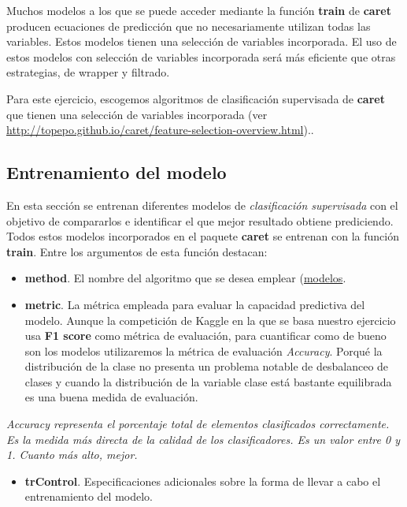 \documentclass[
]{article}
\providecommand{\tightlist}{%
  \setlength{\itemsep}{0pt}\setlength{\parskip}{0pt}}
\begin{document}
Muchos modelos a los que se puede acceder mediante la función
\textbf{train} de \textbf{caret} producen ecuaciones de predicción que
no necesariamente utilizan todas las variables. Estos modelos tienen una
selección de variables incorporada. El uso de estos modelos con
selección de variables incorporada será más eficiente que otras
estrategias, de wrapper y filtrado.

Para este ejercicio, escogemos algoritmos de clasificación supervisada
de \textbf{caret} que tienen una selección de variables incorporada (ver
\url{http://topepo.github.io/caret/feature-selection-overview.html})..

\hypertarget{entrenamiento-del-modelo}{%
\subsection{Entrenamiento del modelo}\label{entrenamiento-del-modelo}}

En esta sección se entrenan diferentes modelos de \emph{clasificación
supervisada} con el objetivo de compararlos e identificar el que mejor
resultado obtiene prediciendo. Todos estos modelos incorporados en el
paquete \textbf{caret} se entrenan con la función \textbf{train}. Entre
los argumentos de esta función destacan:

\begin{itemize}
\item
  \textbf{method}. El nombre del algoritmo que se desea emplear
  (\href{http://topepo.github.io/caret/available-models.html}{modelos}.
\item
  \textbf{metric}. La métrica empleada para evaluar la capacidad
  predictiva del modelo. Aunque la competición de Kaggle en la que se
  basa nuestro ejercicio usa \textbf{F1 score} como métrica de
  evaluación, para cuantificar como de bueno son los modelos
  utilizaremos la métrica de evaluación \emph{Accuracy}. Porqué la
  distribución de la clase no presenta un problema notable de
  desbalanceo de clases y cuando la distribución de la variable clase
  está bastante equilibrada es una buena medida de evaluación.
\end{itemize}

\emph{Accuracy representa el porcentaje total de elementos clasificados
correctamente. Es la medida más directa de la calidad de los
clasificadores. Es un valor entre 0 y 1. Cuanto más alto, mejor.}

\begin{itemize}
\tightlist
\item
  \textbf{trControl}. Especificaciones adicionales sobre la forma de
  llevar a cabo el entrenamiento del modelo.
\end{itemize}
\end{document}
